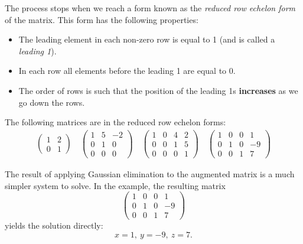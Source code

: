 The process stops when we reach a form known as the \emph{reduced row echelon form} of the matrix. This form has the following properties:
\begin{itemize}
  \item The leading element in each non-zero row is equal to 1 (and is called a \emph{leading 1}).
  \item In each row all elements before the leading 1 are equal to 0.
  \item The order of rows is such that the position of the leading 1s \textbf{increases} as we go down the rows.
\end{itemize}

\begin{example}
  The following matrices are in the reduced row echelon forms:
  \begin{align*}
  \begin{pmatrix} 1 & 2 \\ 0 & 1 \end{pmatrix}\quad
  \begin{pmatrix} 1 & 5 & -2 \\ 0 & 1 & 0 \\ 0 & 0 & 0 \end{pmatrix}\quad
  \begin{pmatrix} 1 & 0 & 4 & 2 \\ 0 & 0 & 1 & 5 \\ 0 & 0 & 0 & 1 \end{pmatrix}\quad
  \begin{pmatrix} 1 & 0 & 0 & 1 \\ 0 & 1 & 0 & -9 \\ 0 & 0 & 1 & 7 \end{pmatrix}
  \end{align*}
\end{example}

The result of applying Gaussian elimination to the augmented matrix is a much simpler system to solve. In the example, the resulting matrix
\begin{equation*}
  \left(\begin{array}{ccc|c}
  1 & 0 & 0 & 1\\
  0  & 1 & 0 & -9\\
  0  & 0 & 1 & 7 
  \end{array}\right)
\end{equation*}
yields the solution directly:
\begin{equation*}
  x=1,\ y=-9,\ z=7.
\end{equation*}

